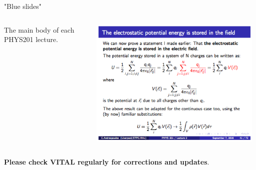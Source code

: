 \begin{frame}{"Blue slides"}

\begin{columns}
  \begin{column}{0.30\textwidth}
   \begin{center}
        The main body of each PHYS201 lecture.\\
   \end{center}
  \end{column}
  \begin{column}{0.70\textwidth}
   \begin{center}
     \includegraphics[width=0.99\textwidth]{./images/example_slides/main.png}\\
   \end{center}
  \end{column}
\end{columns}

\vspace{0.2cm}

\begin{center}
 {\bf Please check VITAL regularly for corrections and updates}.\\
\end{center}

\end{frame}

%
%
%

